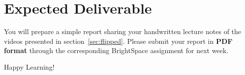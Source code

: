 \documentclass{article}
\begin{document}
\section{Expected Deliverable}
\label{sec:deliverables}

You will prepare a simple report sharing your handwritten lecture notes of the videos presented in section~\ref{sec:flipped}.  Please submit your report in \textbf{PDF format} through the corresponding BrightSpace\texttrademark{} assignment for next week.

\vspace{5mm}
Happy Learning! 
\end{document}
